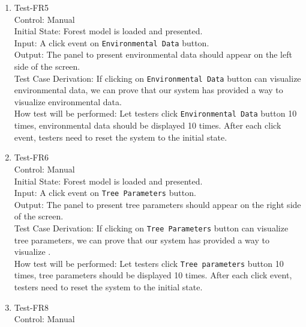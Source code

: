 \documentclass[12pt, titlepage]{article}
\begin{document}
\begin{enumerate}
\item{Test-FR5\\}
Control: Manual\\ 

Initial State: Forest model is loaded and presented.\\

Input: A click event on \verb|Environmental Data| button.\\

Output: The panel to present environmental data should appear on the left side 
of the screen.\\

Test Case Derivation: If clicking on \verb|Environmental Data| button can 
visualize environmental data, we can prove that our system has provided 
a way to visualize environmental data.\\
					
How test will be performed:  Let testers click \verb|Environmental Data| button
10 times, environmental data should be displayed 10 times. After 
each click event, testers need to reset the system to the initial state.

\item{Test-FR6\\}
Control: Manual\\ 

Initial State: Forest model is loaded and presented.\\

Input: A click event on \verb|Tree Parameters| button.\\

Output: The panel to present tree parameters should appear on the 
right side of the screen.\\

Test Case Derivation: If clicking on \verb|Tree Parameters| 
button can  visualize tree parameters, we can prove that our 
system has provided a way to visualize .\\
					
How test will be performed:  Let testers click 
\verb|Tree parameters| button
10 times, tree parameters should be displayed 10 times. After 
each click event, testers need to reset the system to the initial state.


\item{Test-FR8\\}
Control: Manual\\ 


\end{enumerate}
\end{document}
